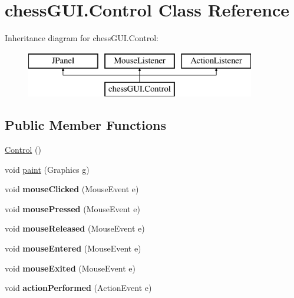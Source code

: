 \hypertarget{classchess_g_u_i_1_1_control}{}\section{chess\+G\+U\+I.\+Control Class Reference}
\label{classchess_g_u_i_1_1_control}
Inheritance diagram for chess\+G\+U\+I.\+Control\+:\begin{figure}[H]
\begin{center}
\leavevmode
\includegraphics[height=2.000000cm]{classchess_g_u_i_1_1_control}
\end{center}
\end{figure}
\subsection*{Public Member Functions}
\begin{DoxyCompactItemize}
\item 
\hyperlink{classchess_g_u_i_1_1_control_ac90efc0d259e84d21ffa95fac1e63d42}{Control} ()
\item 
void \hyperlink{classchess_g_u_i_1_1_control_aa88e3fa81b7dbfc40cd2b1bfaf120ab0}{paint} (Graphics g)
\item 
\mbox{\label{classchess_g_u_i_1_1_control_a4bab2ca00238562006756235c286b75e}} 
void {\bfseries mouse\+Clicked} (Mouse\+Event e)
\item 
\mbox{\label{classchess_g_u_i_1_1_control_a6b61da8fee1e978ce060e05b27c5d046}} 
void {\bfseries mouse\+Pressed} (Mouse\+Event e)
\item 
\mbox{\label{classchess_g_u_i_1_1_control_a78abefe1216996058ae02642007eb08e}} 
void {\bfseries mouse\+Released} (Mouse\+Event e)
\item 
\mbox{\label{classchess_g_u_i_1_1_control_a7840821c207d7c130ffea346361ffcea}} 
void {\bfseries mouse\+Entered} (Mouse\+Event e)
\item 
\mbox{\label{classchess_g_u_i_1_1_control_a7fe35c1e0306eca7455730b169a2e70f}} 
void {\bfseries mouse\+Exited} (Mouse\+Event e)
\item 
\mbox{\label{classchess_g_u_i_1_1_control_afca86d2c9603a9d15539a3fcad1b7708}} 
void {\bfseries action\+Performed} (Action\+Event e)
\end{DoxyCompactItemize}

